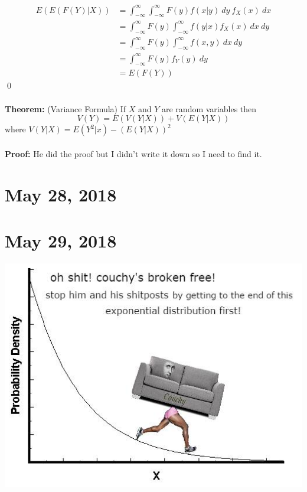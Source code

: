 \documentclass{article}
\newcommand{\thm}{\textbf{Theorem: }}
\newcommand{\proo}{\textbf{Proof: }}
\begin{document}
\begin{align*}
E(E(F(Y)|X)) &= \int_{-\infty}^{\infty} \int_{-\infty}^{\infty} F(y)f(x|y)\ dy\ f_{X}(x)\ dx\\
			&= \int_{-\infty}^{\infty} F(y) \int_{-\infty}^{\infty} f(y|x) f_{X}(x)\ dx\ dy\\
			&= \int_{-\infty}^{\infty} F(y) \int_{-\infty}^{\infty} f(x, y)\ dx\ dy\\
			&= \int_{-\infty}^{\infty} F(y)f_{Y}(y)\ dy\\
			&= E(F(Y))
\end{align*}
\qed\\\\
\thm (Variance Formula) If $X$ and $Y$ are random variables then
\[V(Y) = E(V(Y|X)) + V(E(Y|X))\]
where $V(Y|X) = E(Y^{2}|x) - (E(Y|X))^{2}$\\\\
\proo He did the proof but I didn't write it down so I need to find it.
\newpage

\section{May 28, 2018}
\newpage


\section{May 29, 2018}
\newpage

\includegraphics[scale=0.6]{couchy.jpg}
\end{document}
